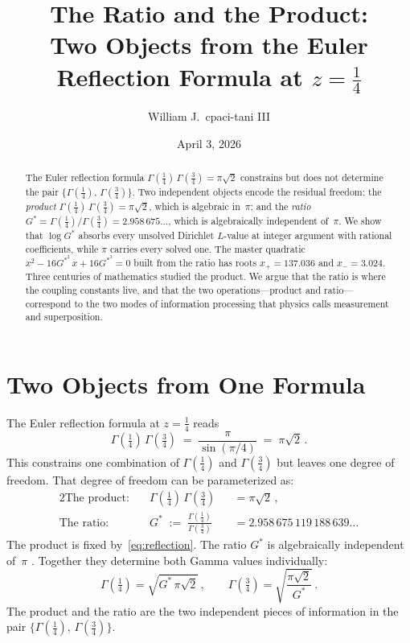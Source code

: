 \documentclass[12pt,reqno]{amsart}
\title{The Ratio and the Product:\\[2pt]
  Two Objects from the Euler Reflection Formula at $z=\tfrac14$}
\author{William J.\ cpaci-tani III}
\date{April 3, 2026}
\theoremstyle{definition}
\theoremstyle{remark}
\newcommand{\Gstar}{G^{\!*}}
\begin{document}
\begin{abstract}
The Euler reflection formula $\Gamma(\tfrac14)\,\Gamma(\tfrac34)=\pi\sqrt{2}$ constrains
but does not determine the pair $\{\Gamma(\tfrac14),\,\Gamma(\tfrac34)\}$. Two independent
objects encode the residual freedom: the \emph{product}
$\Gamma(\tfrac14)\,\Gamma(\tfrac34)=\pi\sqrt{2}$, which is algebraic in~$\pi$; and the
\emph{ratio} $\Gstar=\Gamma(\tfrac14)/\Gamma(\tfrac34)=2.958\,675\ldots$, which is
algebraically independent of~$\pi$. We show that $\log\Gstar$ absorbs every unsolved
Dirichlet $L$-value at integer argument with rational coefficients, while $\pi$ carries
every solved one. The master quadratic $x^2-16\Gstar^2\,x+16\Gstar^3=0$ built from the
ratio has roots $x_+=137.036$ and $x_-=3.024$. Three centuries of mathematics studied
the product. We argue that the ratio is where the coupling constants live, and that the
two operations---product and ratio---correspond to the two modes of information processing
that physics calls measurement and superposition.
\end{abstract}

\maketitle

\section{Two Objects from One Formula}

The Euler reflection formula at $z=\tfrac14$ reads
\begin{equation}\label{eq:reflection}
  \Gamma\!\left(\tfrac14\right)\,\Gamma\!\left(\tfrac34\right)
  \;=\; \frac{\pi}{\sin(\pi/4)}
  \;=\; \pi\sqrt{2}\,.
\end{equation}
This constrains one combination of $\Gamma(\tfrac14)$ and $\Gamma(\tfrac34)$ but leaves
one degree of freedom. That degree of freedom can be parameterized as:
\begin{alignat}{2}
  \text{The product:}&\quad \Gamma\!\left(\tfrac14\right)\,\Gamma\!\left(\tfrac34\right)
  &&= \pi\sqrt{2}\,,
  \label{eq:product}\\[4pt]
  \text{The ratio:}&\quad
  \Gstar \;:=\; \frac{\Gamma(\tfrac14)}{\Gamma(\tfrac34)}
  &&= 2.958\,675\,119\,188\,639\ldots
  \label{eq:ratio}
\end{alignat}
The product is fixed by~\eqref{eq:reflection}. The ratio $\Gstar$ is algebraically
independent of~$\pi$ \cite{Chudnovsky1980,Nesterenko1996}. Together they determine both
Gamma values individually:
\begin{equation}
  \Gamma\!\left(\tfrac14\right) = \sqrt{\Gstar\,\pi\sqrt{2}}\,,\qquad
  \Gamma\!\left(\tfrac34\right) = \sqrt{\frac{\pi\sqrt{2}}{\Gstar}}\,.
\end{equation}
The product and the ratio are the two independent pieces of information in the
pair $\{\Gamma(\tfrac14),\,\Gamma(\tfrac34)\}$.
\end{document}
